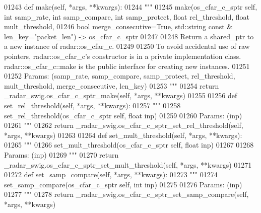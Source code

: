 \begin{DoxyCode}
{{{{{{01243     \textcolor{keyword}{def }make(self, *args, **kwargs):
01244         \textcolor{stringliteral}{"""}
01245 \textcolor{stringliteral}{        make(os\_cfar\_c\_sptr self, int samp\_rate, int samp\_compare, int samp\_protect, float rel\_threshold,
       float mult\_threshold, }
01246 \textcolor{stringliteral}{            bool merge\_consecutive=True, std::string const & len\_key="packet\_len") -> os\_cfar\_c\_sptr}
01247 \textcolor{stringliteral}{}
01248 \textcolor{stringliteral}{        Return a shared\_ptr to a new instance of radar::os\_cfar\_c.}
01249 \textcolor{stringliteral}{}
01250 \textcolor{stringliteral}{        To avoid accidental use of raw pointers, radar::os\_cfar\_c's constructor is in a private
       implementation class. radar::os\_cfar\_c::make is the public interface for creating new instances.}
01251 \textcolor{stringliteral}{}
01252 \textcolor{stringliteral}{        Params: (samp\_rate, samp\_compare, samp\_protect, rel\_threshold, mult\_threshold, merge\_consecutive,
       len\_key)}
01253 \textcolor{stringliteral}{        """}
01254         \textcolor{keywordflow}{return} \_radar\_swig.os\_cfar\_c\_sptr\_make(self, *args, **kwargs)
01255 
01256     \textcolor{keyword}{def }set_rel_threshold(self, *args, **kwargs):
01257         \textcolor{stringliteral}{"""}
01258 \textcolor{stringliteral}{        set\_rel\_threshold(os\_cfar\_c\_sptr self, float inp)}
01259 \textcolor{stringliteral}{}
01260 \textcolor{stringliteral}{        Params: (inp)}
01261 \textcolor{stringliteral}{        """}
01262         \textcolor{keywordflow}{return} \_radar\_swig.os\_cfar\_c\_sptr\_set\_rel\_threshold(self, *args, **kwargs)
01263 
01264     \textcolor{keyword}{def }set_mult_threshold(self, *args, **kwargs):
01265         \textcolor{stringliteral}{"""}
01266 \textcolor{stringliteral}{        set\_mult\_threshold(os\_cfar\_c\_sptr self, float inp)}
01267 \textcolor{stringliteral}{}
01268 \textcolor{stringliteral}{        Params: (inp)}
01269 \textcolor{stringliteral}{        """}
01270         \textcolor{keywordflow}{return} \_radar\_swig.os\_cfar\_c\_sptr\_set\_mult\_threshold(self, *args, **kwargs)
01271 
01272     \textcolor{keyword}{def }set_samp_compare(self, *args, **kwargs):
01273         \textcolor{stringliteral}{"""}
01274 \textcolor{stringliteral}{        set\_samp\_compare(os\_cfar\_c\_sptr self, int inp)}
01275 \textcolor{stringliteral}{}
01276 \textcolor{stringliteral}{        Params: (inp)}
01277 \textcolor{stringliteral}{        """}
01278         \textcolor{keywordflow}{return} \_radar\_swig.os\_cfar\_c\_sptr\_set\_samp\_compare(self, *args, **kwargs)
}}}}}}
\end{DoxyCode}
